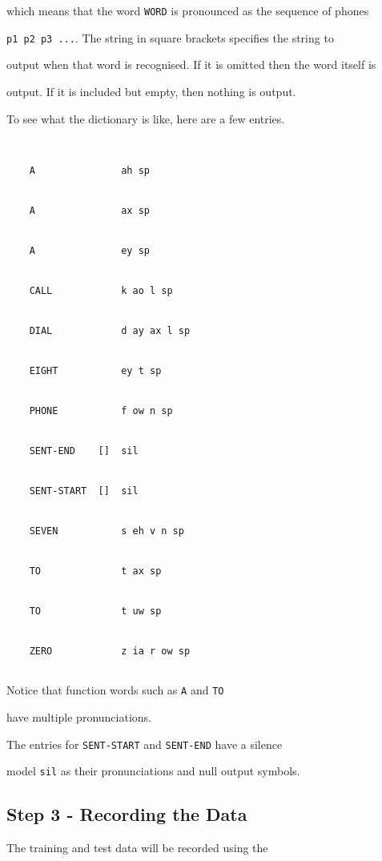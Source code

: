 which means that the word \texttt{WORD} is pronounced as the sequence of phones


\texttt{p1 p2 p3 ...}.  The string in square brackets specifies the string to


output when that word is recognised.  If it is omitted then the word itself is


output.  If it is included but empty, then nothing is output.





To see what the dictionary is like, here are a few entries.


\begin{verbatim}


    A               ah sp


    A               ax sp


    A               ey sp


    CALL            k ao l sp


    DIAL            d ay ax l sp


    EIGHT           ey t sp


    PHONE           f ow n sp


    SENT-END    []  sil


    SENT-START  []  sil


    SEVEN           s eh v n sp


    TO              t ax sp


    TO              t uw sp


    ZERO            z ia r ow sp


\end{verbatim}


Notice that function words such as \texttt{A} and \texttt{TO}


have multiple pronunciations.


The entries for \texttt{SENT-START} and \texttt{SENT-END} have a silence


model \texttt{sil} as their pronunciations and null output symbols.  





\subsection{Step 3 - Recording the Data}





The training and test data will be recorded using the


